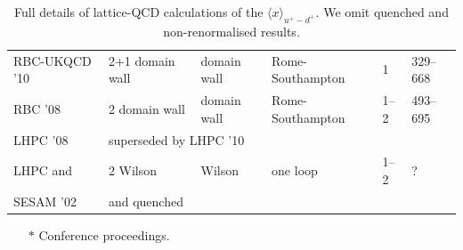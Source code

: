 \begin{table}[t]
{\begin{tabular}{llllll}
  RBC-UKQCD '10 \cite{Aoki:2010xg} &
  2+1 domain wall & domain wall & Rome-Southampton & 1 & 329--668 \\

  RBC '08 \cite{Lin:2008uz} &
  2 domain wall & domain wall & Rome-Southampton & 1--2 & 493--695 \\

  LHPC '08 \cite{Hagler:2007xi} &
  \multicolumn{5}{l}{superseded by LHPC '10} \\

  LHPC and &
  2 Wilson & Wilson & one loop & 1--2 & ?\\
  SESAM '02 \cite{Dolgov:2002zm} &
  and quenched & & & \\
\hline
\end{tabular}
} %
\begin{minipage}{\linewidth}
{\footnotesize 
\begin{itemize}
\item[$*$] Conference proceedings.
\end{itemize}
}
\end{minipage}
\caption{\small Full details of lattice-QCD calculations of the $\langle x\rangle_{u^+-d^+}$. We omit quenched and non-renormalised results.
\label{tab:unpolarisedisotriplet}
}
\end{table}



